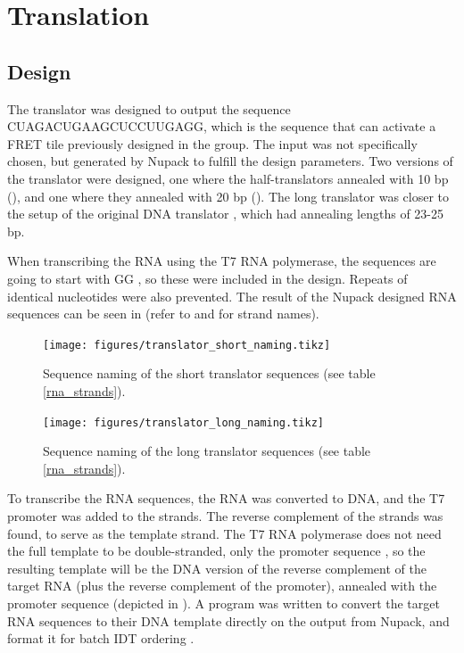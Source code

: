 \section{Translation}
\subsection{Design}
The translator was designed to output the sequence CUAGACUGAAGCUCCUUGAGG, which is the sequence that can activate a FRET tile previously designed in the group. The input was not specifically chosen, but generated by Nupack to fulfill the design parameters. Two versions of the translator were designed, one where the half-translators annealed with 10 bp (), and one where they annealed with 20 bp (). The long translator was closer to the setup of the original DNA translator \cite{Picuri2009}, which had annealing lengths of 23-25 bp.

When transcribing the RNA using the T7 RNA polymerase, the sequences are going to start with GG \cite{Milligan1987}, so these were included in the design. Repeats of identical nucleotides were also prevented. The result of the Nupack designed RNA sequences can be seen in  (refer to  and  for strand names).

\begin{figure}[h]
\centering
\texttt{[image: figures/translator\_short\_naming.tikz]}
\caption{Sequence naming of the short translator sequences (see table \ref{rna_strands}).}
\label{translator_short_subunits}
\end{figure}


\begin{figure}[h]
\centering
\texttt{[image: figures/translator\_long\_naming.tikz]}
\caption{Sequence naming of the long translator sequences (see table \ref{rna_strands}).}
\label{translator_long_subunits}
\end{figure}

To transcribe the RNA sequences, the RNA was converted to DNA, and the T7 promoter was added to the strands. The reverse complement of the strands was found, to serve as the template strand. The T7 RNA polymerase does not need the full template to be double-stranded, only the promoter sequence \cite{Milligan1987}, so the resulting template will be the DNA version of the reverse complement of the target RNA (plus the reverse complement of the promoter), annealed with the promoter sequence (depicted in ). A program was written to convert the target RNA sequences to their DNA template directly on the output from Nupack, and format it for batch IDT ordering \cite{nupackorder}.

